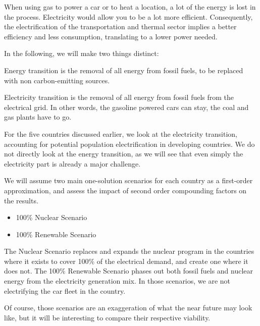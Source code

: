 When using gas to power a car or to heat a location, a lot of the energy is lost in the process. Electricity would allow you to be a lot more efficient. Consequently, the electrification of the transportation and thermal sector implies a better efficiency and less consumption, translating to a lower power needed.

In the following, we will make two things distinct:

\begin{kaobox}[frametitle=Energy Transition]
Energy transition is the removal of all energy from fossil fuels, to be replaced with non carbon-emitting sources.
\end{kaobox}

\begin{kaobox}[frametitle=Electricity Transition]
Electricity transition is the removal of all energy from fossil fuels from the electrical grid. In other words, the gasoline powered cars can stay, the coal and gas plants have to go.
\end{kaobox}


For the five countries discussed earlier, we look at the electricity transition, accounting for potential population electrification in developing countries. We do not directly look at the energy transition, as we will see that even simply the electricity part is already a major challenge.


We will assume two main one-solution scenarios for each country as a first-order approximation, and assess the impact of second order compounding factors on the results.

\begin{itemize}
	\item 100\% Nuclear Scenario
	\item 100\% Renewable Scenario
\end{itemize}

The Nuclear Scenario replaces and expands the nuclear program in the countries where it exists to cover 100\% of the electrical demand, and create one where it does not. The 100\% Renewable Scenario phases out both fossil fuels and nuclear energy from the electricity generation mix. In those scenarios, we are not electrifying the car fleet in the country.

Of course, those scenarios are an exaggeration of what the near future may look like, but it will be interesting to compare their respective viability.

